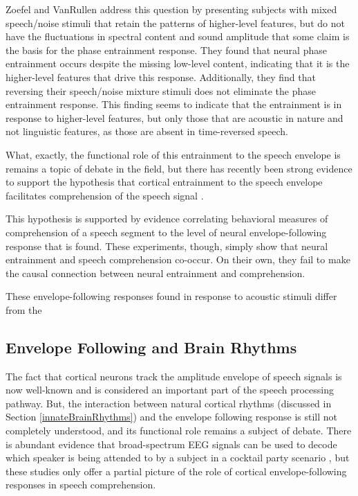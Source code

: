 \documentclass[titlepage]{article}
\begin{document}
    Zoefel and VanRullen \cite{Zoefel2016} address this
    question by presenting subjects with mixed speech/noise stimuli that retain the patterns of
    higher-level features, but do not have the fluctuations in spectral content and sound amplitude that
    some claim is the basis for the phase entrainment response. They found that neural phase entrainment
    occurs despite the missing low-level content, indicating that it is the higher-level features that
    drive this response. Additionally, they find that reversing their speech/noise mixture stimuli
    does not eliminate the phase entrainment response. This finding seems to indicate that the entrainment
    is in response to higher-level features, but only those that are acoustic in nature and not linguistic
    features, as those are absent in time-reversed speech.

    What, exactly, the functional role of this entrainment to the speech envelope
    is remains a topic of debate in the field, but there has recently been strong evidence
    to support the hypothesis that cortical entrainment to the speech
    envelope facilitates comprehension of the speech signal \cite{Ding2014a,Ding2012,OSullivan2015}.


    This hypothesis is supported by evidence correlating behavioral measures of comprehension
    of a speech segment to the level of neural envelope-following response that is found. These
    experiments, though, simply show that neural entrainment and speech comprehension co-occur. On
    their own, they fail to make the causal connection between neural entrainment and comprehension.

    These envelope-following responses found in response to acoustic stimuli differ from the

  \subsection{Envelope Following and Brain Rhythms}

    The fact that cortical neurons track the amplitude envelope of speech signals is now well-known and
    is considered an important part of the speech processing pathway. But, the interaction between
    natural cortical rhythms (discussed in Section \ref{innateBrainRhythms}) and the envelope following
    response is still not completely understood, and its functional role remains a subject of debate.
    There is abundant evidence that broad-spectrum EEG signals can be used to decode which speaker is
    being attended to by a subject in a cocktail party scenario \cite{Horton2014,DeTaillez2018}, but
    these studies only offer a partial picture of the role of cortical envelope-following responses
    in speech comprehension.
\end{document}
